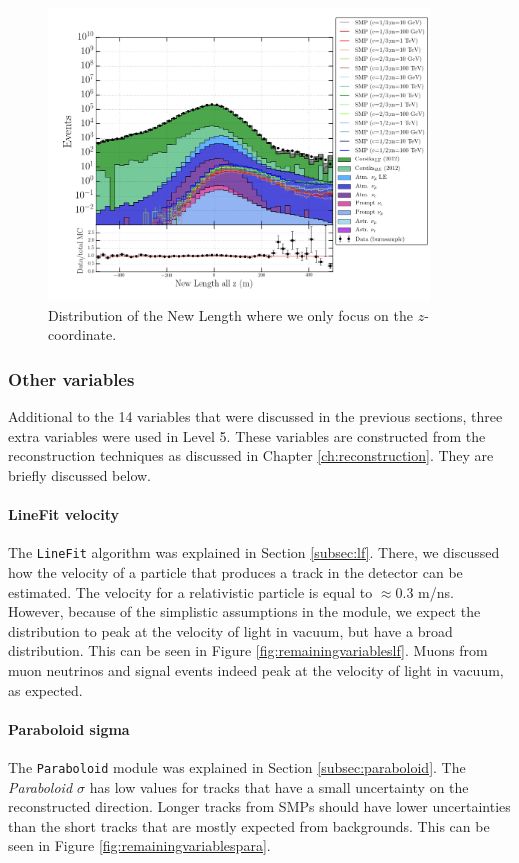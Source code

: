 \begin{figure}
\centering
\includegraphics[width=0.9\textwidth]{chapter8/img/1D_stack_newlength_all_z.png}
\caption{Distribution of the New Length where we only focus on the $z$-coordinate.}
\label{fig:newvariablesnewlengthallz}
\end{figure}


\subsubsection{Other variables}
\label{subsub:other}
Additional to the 14 variables that were discussed in the previous sections, three extra variables were used in Level 5. These variables are constructed from the reconstruction techniques as discussed in Chapter \ref{ch:reconstruction}. They are briefly discussed below.

\paragraph{LineFit velocity}
The \texttt{LineFit} algorithm was explained in Section \ref{subsec:lf}. There, we discussed how the velocity of a particle that produces a track in the detector can be estimated. The velocity for a relativistic particle is equal to $\approx$0.3 m/ns. However, because of the simplistic assumptions in the module, we expect the distribution to peak at the velocity of light in vacuum, but have a broad distribution. This can be seen in Figure \ref{fig:remainingvariableslf}. Muons from muon neutrinos and signal events indeed peak at the velocity of light in vacuum, as expected.

\paragraph{Paraboloid sigma}
The \texttt{Paraboloid} module was explained in Section \ref{subsec:paraboloid}. The \textit{Paraboloid $\sigma$} has low values for tracks that have a small uncertainty on the reconstructed direction. Longer tracks from SMPs should have lower uncertainties than the short tracks that are mostly expected from backgrounds. This can be seen in Figure \ref{fig:remainingvariablespara}.

